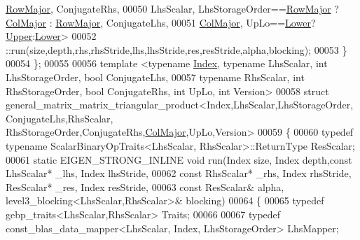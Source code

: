 \begin{DoxyCode}
      \hyperlink{group__enums_ggaacded1a18ae58b0f554751f6cdf9eb13acfcde9cd8677c5f7caf6bd603666aae3}{RowMajor}, ConjugateRhs,
00050         LhsScalar, LhsStorageOrder==\hyperlink{group__enums_ggaacded1a18ae58b0f554751f6cdf9eb13acfcde9cd8677c5f7caf6bd603666aae3}{RowMajor} ? \hyperlink{group__enums_ggaacded1a18ae58b0f554751f6cdf9eb13a0cbd4bdd0abcfc0224c5fcb5e4f6669a}{ColMajor} : 
      \hyperlink{group__enums_ggaacded1a18ae58b0f554751f6cdf9eb13acfcde9cd8677c5f7caf6bd603666aae3}{RowMajor}, ConjugateLhs,
00051         \hyperlink{group__enums_ggaacded1a18ae58b0f554751f6cdf9eb13a0cbd4bdd0abcfc0224c5fcb5e4f6669a}{ColMajor}, UpLo==\hyperlink{group__enums_gga39e3366ff5554d731e7dc8bb642f83cda891792b8ed394f7607ab16dd716f60e6}{Lower}?\hyperlink{group__enums_gga39e3366ff5554d731e7dc8bb642f83cda6bcb58be3b8b8ec84859ce0c5ac0aaec}{Upper}:\hyperlink{group__enums_gga39e3366ff5554d731e7dc8bb642f83cda891792b8ed394f7607ab16dd716f60e6}{Lower}>
00052       ::run(size,depth,rhs,rhsStride,lhs,lhsStride,res,resStride,alpha,blocking);
00053   \}
00054 \};
00055 
00056 \textcolor{keyword}{template} <\textcolor{keyword}{typename} \hyperlink{namespace_eigen_a62e77e0933482dafde8fe197d9a2cfde}{Index}, \textcolor{keyword}{typename} LhsScalar, \textcolor{keywordtype}{int} LhsStorageOrder, \textcolor{keywordtype}{bool} ConjugateLhs,
00057                           \textcolor{keyword}{typename} RhsScalar, \textcolor{keywordtype}{int} RhsStorageOrder, \textcolor{keywordtype}{bool} ConjugateRhs, \textcolor{keywordtype}{int}  UpLo, \textcolor{keywordtype}{int} 
      Version>
00058 \textcolor{keyword}{struct }general\_matrix\_matrix\_triangular\_product<Index,LhsScalar,LhsStorageOrder,ConjugateLhs,RhsScalar,
      RhsStorageOrder,ConjugateRhs,\hyperlink{group__enums_ggaacded1a18ae58b0f554751f6cdf9eb13a0cbd4bdd0abcfc0224c5fcb5e4f6669a}{ColMajor},UpLo,Version>
00059 \{
00060   \textcolor{keyword}{typedef} \textcolor{keyword}{typename} ScalarBinaryOpTraits<LhsScalar, RhsScalar>::ReturnType ResScalar;
00061   \textcolor{keyword}{static} EIGEN\_STRONG\_INLINE \textcolor{keywordtype}{void} run(Index size, Index depth,\textcolor{keyword}{const} LhsScalar* \_lhs, Index lhsStride,
00062                                       \textcolor{keyword}{const} RhsScalar* \_rhs, Index rhsStride, ResScalar* \_res, Index 
      resStride,
00063                                       \textcolor{keyword}{const} ResScalar& alpha, level3\_blocking<LhsScalar,RhsScalar>& 
      blocking)
00064   \{
00065     \textcolor{keyword}{typedef} gebp\_traits<LhsScalar,RhsScalar> Traits;
00066 
00067     \textcolor{keyword}{typedef} const\_blas\_data\_mapper<LhsScalar, Index, LhsStorageOrder> LhsMapper;

\end{DoxyCode}
